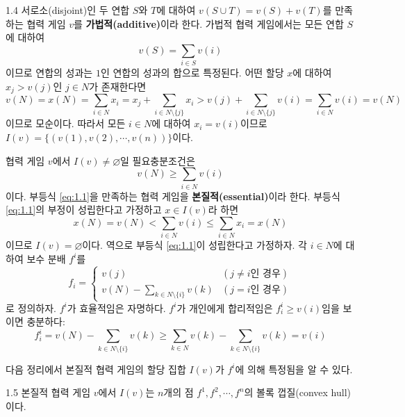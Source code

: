 \documentclass{article}
\numberwithin{equation}{section}
\begin{document}
\begin{example}{}{1.4}
	서로소(disjoint)인 두 연합 $S$와 $T$에 대하여 $v(S\cup T)=v(S)+v(T)$를 만족하는 협력 게임 $v$를 \textbf{가법적(additive)}이라 한다. 가법적 협력 게임에서는 모든 연합 $S$에 대하여
	\[
		v(S)=\sum_{i\in S}v(i)
	\]
	이므로 연합의 성과는 $1$인 연합의 성과의 합으로 특정된다. 어떤 할당 $x$에 대하여 $x_j>v(j)$인 $j\in N$가 존재한다면
	\[
		v(N)=x(N)=\sum_{i\in N}x_i=x_j+\sum_{i\in N\setminus\{j\}}x_i>v(j)+\sum_{i\in N\setminus\{j\}}v(i)=\sum_{i\in N}v(i)=v(N)
	\]
	이므로 모순이다. 따라서 모든 $i\in N$에 대하여 $x_i=v(i)$이므로 $I(v)=\{(v(1),v(2),\cdots,v(n))\}$이다.
\end{example}

협력 게임 $v$에서 $I(v)\ne\varnothing$일 필요충분조건은
\begin{equation}
	\label{eq:1.1}
	v(N)\geq\sum_{i\in N}v(i)
\end{equation}
이다. 부등식 \ref{eq:1.1}을 만족하는 협력 게임을 \textbf{본질적(essential)}이라 한다. 부등식 \ref{eq:1.1}의 부정이 성립한다고 가정하고 $x\in I(v)$라 하면
\[
	x(N)=v(N)<\sum_{i\in N}v(i)\leq\sum_{i\in N}x_i=x(N)
\]
이므로 $I(v)=\varnothing$이다. 역으로 부등식 \ref{eq:1.1}이 성립한다고 가정하자. 각 $i\in N$에 대하여 보수 분배 $f^i$를
\[
	f_i=\begin{cases}
		v(j) & (j\ne i\text{인 경우})\\
		v(N)-\sum_{k\in N\setminus\{i\}}v(k) & (j=i\text{인 경우})
	\end{cases}
\]
로 정의하자. $f^i$가 효율적임은 자명하다. $f^i$가 개인에게 합리적임은 $f_i^i\geq v(i)$임을 보이면 충분하다:
\[
	f_i^i=v(N)-\sum_{k\in N\setminus\{i\}}v(k)\geq\sum_{k\in N}v(k)-\sum_{k\in N\setminus\{i\}}v(k)=v(i)
\]

다음 정리에서 본질적 협력 게임의 할당 집합 $I(v)$가 $f^i$에 의해 특정됨을 알 수 있다.

\begin{thm}{}{1.5}
  본질적 협력 게임 $v$에서 $I(v)$는 $n$개의 점 $f^1,f^2,\cdots,f^n$의 볼록 껍질(convex hull)이다.
\end{thm}
\end{document}

